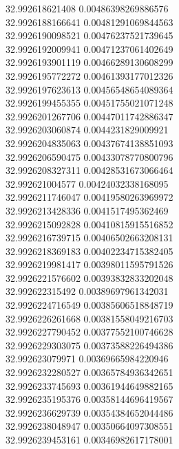 {32.992618621408	0.00486398269886576\\
32.9926188166641	0.00481291069844563\\
32.9926190098521	0.00476237521739645\\
32.9926192009941	0.00471237061402649\\
32.9926193901119	0.00466289130608299\\
32.9926195772272	0.00461393177012326\\
32.9926197623613	0.00456548654089364\\
32.9926199455355	0.00451755021071248\\
32.9926201267706	0.00447011742886347\\
32.9926203060874	0.0044231829009921\\
32.9926204835063	0.00437674138851093\\
32.9926206590475	0.00433078770800796\\
32.9926208327311	0.00428531673066464\\
32.992621004577	0.00424032338168095\\
32.9926211746047	0.00419580263969972\\
32.9926213428336	0.0041517495362469\\
32.9926215092828	0.00410815915516852\\
32.9926216739715	0.00406502663208131\\
32.9926218369183	0.00402234715382405\\
32.9926219981417	0.00398011595791526\\
32.9926221576602	0.00393832833202048\\
32.992622315492	0.00389697961342031\\
32.9926224716549	0.00385606518848719\\
32.9926226261668	0.00381558049216703\\
32.9926227790452	0.00377552100746628\\
32.9926229303075	0.00373588226494386\\
32.992623079971	0.00369665984220946\\
32.9926232280527	0.00365784936342651\\
32.9926233745693	0.00361944649882165\\
32.9926235195376	0.00358144696419567\\
32.9926236629739	0.00354384652044486\\
32.9926238048947	0.00350664097308551\\
32.9926239453161	0.00346982617178001\\
}
